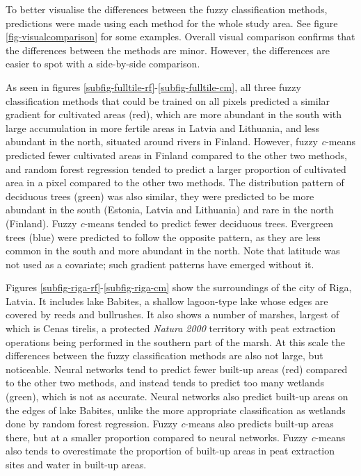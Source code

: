 \documentclass[a4paper,12pt]{scrbook}
\begin{document}

To better visualise the differences between the fuzzy classification methods, predictions were made using each method for the whole study area. See figure \ref{fig-visualcomparison} for some examples. Overall visual comparison confirms that the differences between the methods are minor. However, the differences are easier to spot with a side-by-side comparison.

As seen in figures \ref{subfig-fulltile-rf}-\ref{subfig-fulltile-cm}, all three fuzzy classification methods that could be trained on all pixels predicted a similar gradient for cultivated areas (red), which are more abundant in the south with large accumulation in more fertile areas in Latvia and Lithuania, and less abundant in the north, situated around rivers in Finland. However, fuzzy \textit{c}-means predicted fewer cultivated areas in Finland compared to the other two methods, and random forest regression tended to predict a larger proportion of cultivated area in a pixel compared to the other two methods. The distribution pattern of deciduous trees (green) was also similar, they were predicted to be more abundant in the south (Estonia, Latvia and Lithuania) and rare in the north (Finland). Fuzzy \textit{c}-means tended to predict fewer deciduous trees. Evergreen trees (blue) were predicted to follow the opposite pattern, as they are less common in the south and more abundant in the north. Note that latitude was not used as a covariate; such gradient patterns have emerged without it.

Figures \ref{subfig-riga-rf}-\ref{subfig-riga-cm} show the surroundings of the city of Riga, Latvia. It includes lake Babites, a shallow lagoon-type lake whose edges are covered by reeds and bullrushes. It also shows a number of marshes, largest of which is Cenas tirelis, a protected \textit{Natura 2000} territory with peat extraction operations being performed in the southern part of the marsh. At this scale the differences between the fuzzy classification methods are also not large, but noticeable. Neural networks tend to predict fewer built-up areas (red) compared to the other two methods, and instead tends to predict too many wetlands (green), which is not as accurate. Neural networks also predict built-up areas on the edges of lake Babites, unlike the more appropriate classification as wetlands done by random forest regression. Fuzzy \textit{c}-means also predicts built-up areas there, but at a smaller proportion compared to neural networks. Fuzzy \textit{c}-means also tends to overestimate the proportion of built-up areas in peat extraction sites and water in built-up areas.
\end{document}
